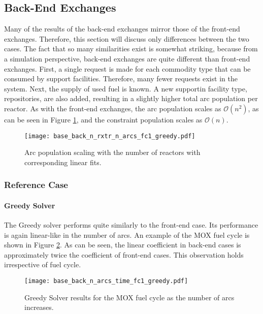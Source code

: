 \subsection{Back-End Exchanges}

Many of the results of the back-end exchanges mirror those of the front-end
exchanges. Therefore, this section will discuss only differences between the two
cases. The fact that so many similarities exist is somewhat striking, because
from a simulation perspective, back-end exchanges are quite different than
front-end exchanges. First, a single request is made for each commodity type
that can be consumed by support facilities. Therefore, many fewer requests exist
in the system. Next, the supply of used fuel is known. A new supportin facility
type, repositories, are also added, resulting in a slightly higher total arc
population per reactor. As with the front-end exchanges, the arc population
scales as $\mathcal{O}(n^2)$, as can be seen in Figure
\ref{fig:base_back_n_rxtr_n_arcs_fc1_greedy}, and the constraint population
scales as $\mathcal{O}(n)$.

\begin{figure}[h!]
  \begin{center}
    \texttt{[image: base\_back\_n\_rxtr\_n\_arcs\_fc1\_greedy.pdf]}
    \caption{
      \label{fig:base_back_n_rxtr_n_arcs_fc1_greedy}
      Arc population scaling with the number of reactors with corresponding linear fits.}
  \end{center}
\end{figure}

\subsubsection{Reference Case}

\paragraph{Greedy Solver}

The Greedy solver performs quite similarly to the front-end case. Its
performance is again linear-like in the number of arcs. An example of the MOX
fuel cycle is shown in Figure \ref{fig:base_back_n_arcs_time_fc1_greedy}. As can
be seen, the linear coefficient in back-end cases is approximately twice the
coefficient of front-end cases. This observation holds irrespective of fuel
cycle.

\begin{figure}[h!]
  \begin{center}
    \texttt{[image: base\_back\_n\_arcs\_time\_fc1\_greedy.pdf]}
    \caption{
      \label{fig:base_back_n_arcs_time_fc1_greedy}
      Greedy Solver results for the MOX fuel cycle as the number of arcs
      increases.      
    }
  \end{center}
\end{figure}


